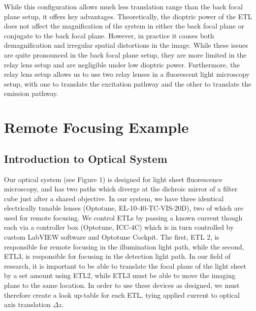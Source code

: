 While this configuration allows much less translation range than the back focal plane setup, it offers key advantages. Theoretically, the dioptric power of the ETL does not affect the magnification of the system in either the back focal plane or conjugate to the back focal plane. However, in practice it causes both demagnification and irregular spatial distortions in the image. While these issues are quite pronounced in the back focal plane setup, they are more limited in the relay lens setup and are negligible under low dioptric power. \cite{Qu}\cite{Fahrbach} Furthermore, the relay lens setup allows us to use two relay lenses in a fluorescent light microscopy setup, with one to translate the excitation pathway and the other to translate the emission pathway.

\section{Remote Focusing Example}
\subsection{Introduction to Optical System}
Our optical system \cite{Hobson}\cite{Liu} (see Figure 1) is designed for light sheet fluorescence microscopy, and has two paths which diverge at the dichroic mirror of a filter cube just after a shared objective. 
In our system, we have three identical electrically tunable lenses (Optotune, EL-10-40-TC-VIS-20D), two of which are used for remote focusing. \cite{Hobson} We control ETLs by passing a known current though each via a controller box (Optotune, ICC-4C) which is in turn controlled by custom LabVIEW software and Optotune Cockpit. The first, ETL 2, is responsible for remote focusing in the illumination light path, while the second, ETL3, is responsible for focusing in the detection light path. In our field of research, it is important to be able to translate the focal plane of the light sheet by a set amount using ETL2, while ETL3 must be able to move the imaging plane to the same location.  In order to use these devices as designed, we must therefore create a look up-table for each ETL, tying applied current to optical axis translation $\Delta z$. 

